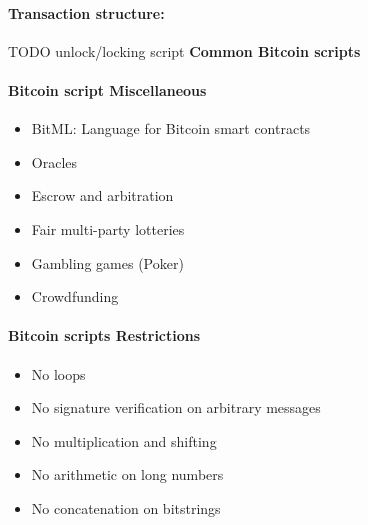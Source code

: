 \paragraph{Transaction structure:\newline}
\begin{minipage}{0.5\linewidth}
    \centering      
    \def\svgwidth{\columnwidth}
        
\end{minipage}
TODO unlock/locking script\newline
\textbf{Common Bitcoin scripts}\newline
\begin{minipage}{0.5\linewidth}
    \centering      
    \def\svgwidth{\columnwidth}
        
\end{minipage}
\paragraph{Bitcoin script Miscellaneous}
\begin{itemize}
    \item BitML: Language for Bitcoin smart contracts
    \item Oracles
    \item Escrow and arbitration
    \item Fair multi-party lotteries
    \item Gambling games (Poker)
    \item Crowdfunding
\end{itemize}{}
\paragraph{Bitcoin scripts Restrictions}
\begin{itemize}
    \item No loops
    \item No signature verification on arbitrary messages
    \item No multiplication and shifting
    \item No arithmetic on long numbers
    \item No concatenation on bitstrings
\end{itemize}

